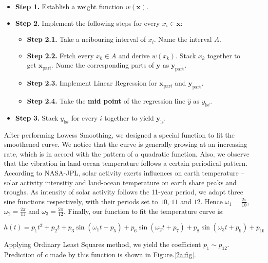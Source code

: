 \documentclass[12pt]{article}
\begin{document}
\begin{itemize}
    \item \textbf{Step 1.} Establish a weight function $w(\boldsymbol{x})$.
    \item \textbf{Step 2.} Implement the following steps for every $x_i \in \boldsymbol{x}$: 
    \begin{itemize}
        \item \textbf{Step 2.1.} Take a neibouring interval of $x_i$. Name the interval $A$.
        \item \textbf{Step 2.2.} Fetch every $x_k \in A$ and derive $w(x_k)$. Stack $x_k$ together to get $\boldsymbol{x}_{\text{part}}$. Name the corresponding parts of $\boldsymbol{y}$ as $\boldsymbol{y}_{\text{part}}$.
        \item \textbf{Step 2.3.} Implement Linear Regression for $\boldsymbol{x}_{\text{part}}$ and $\boldsymbol{y}_{\text{part}}$. 
        \item \textbf{Step 2.4.} Take the \textbf{mid point} of the regression line $\hat y$ as $y_{\text{ls}i}$. 
    \end{itemize}
    \item \textbf{Step 3.} Stack $y_{\text{ls}i}$ for every $i$ together to yield $\boldsymbol{y}_\text{ls}$.
\end{itemize}

After performing Lowess Smoothing, we designed a special function to fit the smoothened curve. We notice that the curve is generally growing at an increasing rate, which is in accord with the pattern of a quadratic function. Also, we observe that the vibration in land-ocean temperature follows a certain periodical pattern. According to NASA-JPL, solar activity exerts influences on earth temperature -- solar activity intensitiy and land-ocean temperature on earth share peaks and troughs. As intensity of solar activity follows the 11-year period, we adapt three sine functions respectively, with their periods set to $10$, $11$ and $12$. Hence $\omega_1=\frac{2\pi}{10}$, $\omega_2 = \frac{2\pi}{11}$ and $\omega_3 = \frac{2\pi}{12}$. Finally, our function to fit the temperature curve is:

\begin{equation}
    \label{2a:main}
    h(t) = p_1 t^2 + p_2 t + p_3\sin(\omega_1 t + p_5) + p_6\sin(\omega_2 t + p_7) + p_8\sin(\omega_3 t + p_9) + p_{10}
\end{equation}

Applying Ordinary Least Squares method, we yield the coefficient $p_1 \sim p_12$. Prediction of $c$ made by this function is shown in Figure.\ref{2a:fig}.
\end{document}
